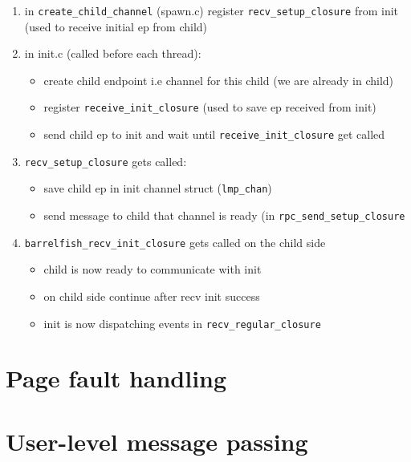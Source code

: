 \documentclass[11pt,a4paper]{report}
\begin{document}
\begin{enumerate}
    \item in \verb|create_child_channel| (spawn.c) register
    \verb|recv_setup_closure| from init
    (used to receive initial ep from child)

    \item in init.c (called before each thread): 
        \begin{itemize}
            \item create child endpoint i.e channel for this child (we are already in child)
            \item register \verb|receive_init_closure| (used to save ep received from init)
            \item send child ep to init and wait until
            \verb|receive_init_closure| get called
        \end{itemize}
    \item \verb|recv_setup_closure| gets called:
        \begin{itemize} 
            \item save child ep in init channel struct (\verb|lmp_chan|)
            \item send message to child that channel is ready (in
            \verb|rpc_send_setup_closure|
        \end{itemize}
    \item \verb|barrelfish_recv_init_closure| gets called on the child side
        \begin{itemize}
            \item child is now ready to communicate with init
            \item on child side continue after recv init success
            \item init is now dispatching events in \verb|recv_regular_closure|
        \end{itemize}
\end{enumerate}

\chapter{Page fault handling}




\chapter{User-level message passing}


\end{document}
